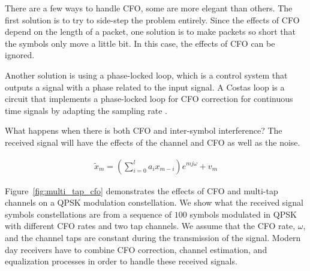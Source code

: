 There are a few ways to handle CFO, some are more elegant than others. 
The first solution is to try to side-step the problem entirely.  
Since the effects of CFO depend on the length of a packet, one solution is to make packets so short that the symbols only move a little bit.  In this case, the effects of CFO can be ignored.

Another solution is using a phase-locked loop, which is a control system that outputs a signal with a phase related to the input signal.  
A Costas loop is a circuit that implements a phase-locked loop for CFO correction for continuous time signals by adapting the sampling rate \cite{costas}.

What happens when there is both CFO and inter-symbol interference?  The received signal will have the effects of the channel and CFO as well as the noise. 

\begin{align}
\tilde{x}_m = (\sum_{i=0}^l a_i x_{m-i})e^{mj\omega} + v_m
\end{align}

Figure~\ref{fig:multi_tap_cfo} demonstrates the effects of CFO and multi-tap channels on a QPSK modulation constellation. 
We show what the received signal symbols constellations are from a sequence of $100$ symbols modulated in QPSK with different CFO rates and two tap channels.  We assume that the CFO rate, $\omega$, and the channel taps are constant during the transmission of the signal.  
Modern day receivers have to combine CFO correction, channel estimation, and equalization processes in order to handle these received signals.

